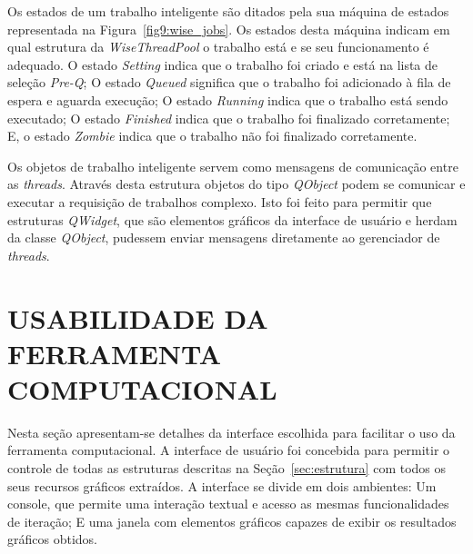Os estados de um trabalho inteligente são ditados pela sua máquina de estados representada na Figura~\ref{fig9:wise_jobs}. Os estados desta máquina indicam em qual estrutura da \textit{WiseThreadPool} o trabalho está e se seu funcionamento é adequado. O estado \textit{Setting} indica que o trabalho foi criado e está na lista de seleção \textit{Pre-Q}; O estado \textit{Queued} significa que o trabalho foi adicionado à fila de espera e aguarda execução; O estado \textit{Running} indica que o trabalho está sendo executado; O estado \textit{Finished} indica que o trabalho foi finalizado corretamente; E, o estado \textit{Zombie} indica que o trabalho não foi finalizado corretamente. 


Os objetos de trabalho inteligente servem como mensagens de comunicação entre as \textit{threads}. Através desta estrutura objetos do tipo \textit{QObject} podem se comunicar e executar a requisição de trabalhos complexo. Isto foi feito para permitir que estruturas \textit{QWidget}, que são elementos gráficos da interface de usuário e herdam da classe \textit{QObject}, pudessem enviar mensagens diretamente ao gerenciador de \textit{threads}. 

\chapter{USABILIDADE DA FERRAMENTA COMPUTACIONAL}\label{sec:userinterface}

Nesta seção apresentam-se detalhes da interface escolhida para facilitar o uso da ferramenta computacional. A interface de usuário foi concebida para permitir o controle de todas as estruturas descritas na Seção~\ref{sec:estrutura} com todos os seus recursos gráficos extraídos. A interface se divide em dois ambientes: Um console, que permite uma interação textual e acesso as mesmas funcionalidades de iteração; E uma janela com elementos gráficos capazes de exibir os resultados gráficos obtidos. 

